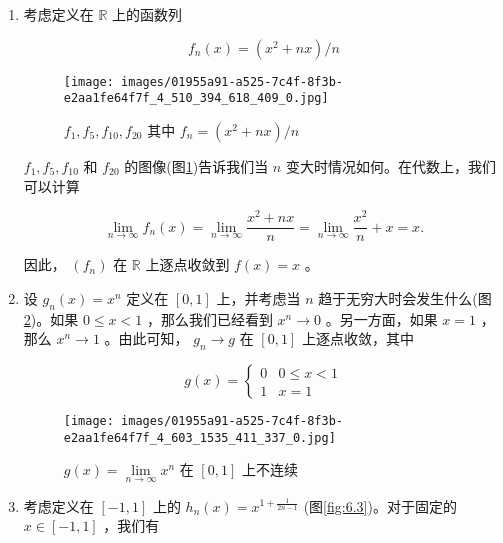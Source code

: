 \begin{Eg}\label{eg:6.2.2}
\begin{enumerate}[label = (\roman*)]
\item\label{item:6.2.1}考虑定义在 $\mathbb{R}$ 上的函数列

\[
{f}_{n}\left( x\right)  = \left( {{x}^{2} + {nx}}\right) /n
\]

\begin{figure}[h]
  \centering
  \texttt{[image: images/01955a91-a525-7c4f-8f3b-e2aa1fe64f7f\_4\_510\_394\_618\_409\_0.jpg]}
  \caption{\({f}_{1},{f}_{5},{f}_{10},{f}_{20}\) 其中 \({f}_{n} = \left( {{x}^{2} + {nx}}\right) /n\) }\label{fig:6.1}
\end{figure}


\({f}_{1},{f}_{5},{f}_{10}\) 和 \({f}_{20}\) 的图像(图\ref{fig:6.1})告诉我们当 \(n\) 变大时情况如何。在代数上，我们可以计算

\[
\mathop{\lim }\limits_{{n \rightarrow  \infty }}{f}_{n}\left( x\right)  = \mathop{\lim }\limits_{{n \rightarrow  \infty }}\frac{{x}^{2} + {nx}}{n} = \mathop{\lim }\limits_{{n \rightarrow  \infty }}\frac{{x}^{2}}{n} + x = x.
\]

因此， \(\left( {f}_{n}\right)\) 在 \(\mathbb{R}\) 上逐点收敛到 \(f\left( x\right)  = x\) 。

\item \label{item:6.2.2}设 \({g}_{n}\left( x\right)  = {x}^{n}\) 定义在 \(\left\lbrack  {0,1}\right\rbrack\) 上，并考虑当 \(n\) 趋于无穷大时会发生什么(图\ref{fig:6.2})。如果 \(0 \leq  x < 1\) ，那么我们已经看到 \({x}^{n} \rightarrow  0\) 。另一方面，如果 \(x = 1\) ，那么 \({x}^{n} \rightarrow  1\) 。由此可知， \({g}_{n} \rightarrow  g\) 在 \(\left\lbrack  {0,1}\right\rbrack\) 上逐点收敛，其中

\[
g\left( x\right)  = \left\{  \begin{array}{ll} 0 & 0 \leq  x < 1 \\  1 &x = 1 \end{array}\right.
\]


\begin{figure}[h]
  \centering
  \texttt{[image: images/01955a91-a525-7c4f-8f3b-e2aa1fe64f7f\_4\_603\_1535\_411\_337\_0.jpg]}
  \caption{\(g\left( x\right)  = \mathop{\lim }\limits_{{n \rightarrow  \infty }}{x}^{n}\) 在 \(\left\lbrack  {0,1}\right\rbrack\) 上不连续}
  \label{fig:6.2}
\end{figure}


\item \label{item:6.2.3}考虑定义在 $[-1,1]$ 上的 \({h}_{n}\left( x\right)  = {x}^{1 + \frac{1}{{2n} - 1}}\) (图\ref{fig:6.3})。对于固定的 \(x \in  \left\lbrack  {-1,1}\right\rbrack\) ，我们有


\end{enumerate}
\end{Eg}
